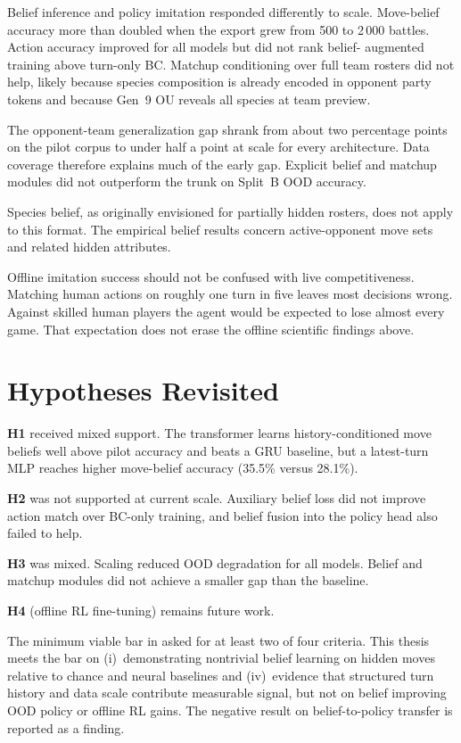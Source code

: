 Belief inference and policy imitation responded differently to scale.
Move-belief accuracy more than doubled when the export grew from 500 to 2\,000
battles. Action accuracy improved for all models but did not rank belief-
augmented training above turn-only BC. Matchup conditioning over full team rosters
did not help, likely because species composition is already encoded in opponent
party tokens and because Gen~9 OU reveals all species at team preview.

The opponent-team generalization gap shrank from about two percentage points on
the pilot corpus to under half a point at scale for every architecture. Data
coverage therefore explains much of the early gap. Explicit belief and matchup
modules did not outperform the trunk on Split~B OOD accuracy.

Species belief, as originally envisioned for partially hidden rosters, does not
apply to this format. The empirical belief results concern active-opponent move
sets and related hidden attributes.

Offline imitation success should not be confused with live competitiveness.
Matching human actions on roughly one turn in five leaves most decisions wrong.
Against skilled human players the agent would be expected to lose almost every
game. That expectation does not erase the offline scientific findings above.

\section{Hypotheses Revisited}

\textbf{H1} received mixed support. The transformer learns history-conditioned
move beliefs well above pilot accuracy and beats a GRU baseline, but a
latest-turn MLP reaches higher move-belief accuracy (35.5\% versus 28.1\%).

\textbf{H2} was not supported at current scale. Auxiliary belief loss did not
improve action match over BC-only training, and belief fusion into the policy
head also failed to help.

\textbf{H3} was mixed. Scaling reduced OOD degradation for all models. Belief
and matchup modules did not achieve a smaller gap than the baseline.

\textbf{H4} (offline RL fine-tuning) remains future work.

The minimum viable bar in  asked for at least two of four
criteria. This thesis meets the bar on (i)~demonstrating nontrivial belief
learning on hidden moves relative to chance and neural baselines and
(iv)~evidence that structured turn history and data scale contribute measurable
signal, but not on belief improving OOD policy or offline RL gains. The negative
result on belief-to-policy transfer is reported as a finding.

